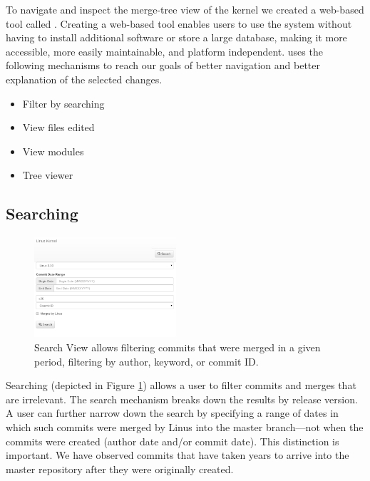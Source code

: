 
To navigate and inspect the merge-tree view of the kernel we created a
web-based tool called \tool. Creating a web-based tool enables users to
use the system without having to install additional software or store a
large database, making it more accessible, more easily maintainable, and
platform independent. \tool uses the following mechanisms to reach our
goals of better navigation and better explanation of the selected
changes.

\begin{itemize}
        \item Filter by searching
        \item View files edited
        \item View modules
        \item Tree viewer
\end{itemize}

\subsection{Searching}

\begin{figure}
        \centering
        \includegraphics[width=0.47\textwidth]{figures/search.png}
        \caption{Search View allows filtering commits that were merged in a given
                period, filtering by author, keyword, or commit ID.}
        \label{fig:search}
\end{figure}

Searching (depicted in Figure \ref{fig:search}) allows a user to filter
commits and merges that are irrelevant. The search mechanism breaks down
the results by release version. A user can further narrow down the
search by specifying a range of dates in which such commits were merged
by Linus into the master branch---not when the commits were created
(author date and/or commit date). This distinction is important. We have
observed commits that have taken years to arrive into the master
repository after they were originally created.

